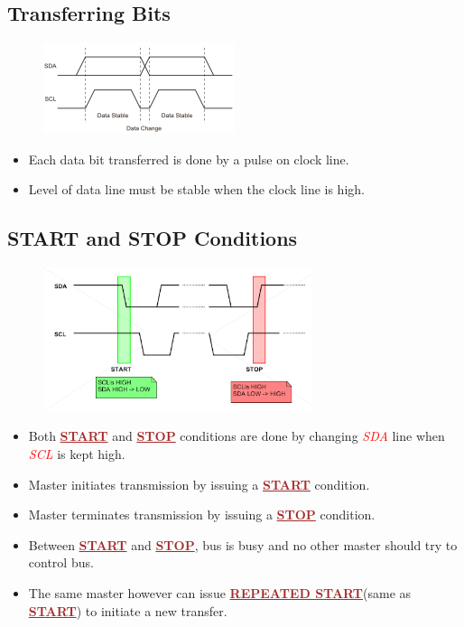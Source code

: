 \documentclass{article}
\newcommand{\pinFormat}[1]{\emph{\textcolor{red}{#1}}}
\newcommand{\iicFormat}[1]{\textbf{\textcolor{brown}{\underline{#1}}}}
\begin{document}
\subsection{Transferring Bits}
\begin{figure}[H]
    \centering
    \includegraphics[width=0.5\textwidth]{i2cTransferBits.png}
\end{figure}
\begin{itemize}
    \item Each data bit transferred is done by a pulse on clock line.
    \item Level of data line must be stable when the clock line is high.
\end{itemize}

\subsection{START and STOP Conditions}
\begin{figure}[H]
    \centering
    \includegraphics[width=0.7\textwidth]{i2cSTARTSTOP.png}
\end{figure}
\begin{itemize}
	\item Both \iicFormat{START} and \iicFormat{STOP} conditions are done by changing \pinFormat{SDA} line when \pinFormat{SCL} is kept high.
	\item Master initiates transmission by issuing a \iicFormat{START} condition.
	\item Master terminates transmission by issuing a \iicFormat{STOP} condition.
	\item Between \iicFormat{START} and \iicFormat{STOP}, bus is busy and no other master should try to control bus.
	\item The same master however can issue \iicFormat{REPEATED START}(same as \iicFormat{START}) to initiate a new transfer.
\end{itemize}
\end{document}
